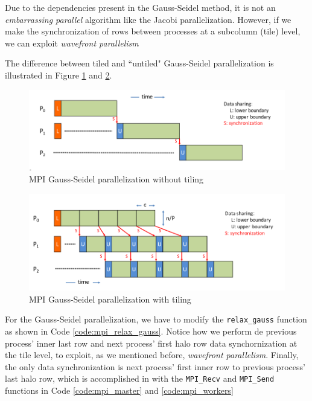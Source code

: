 \documentclass[titlepage]{article}
\newcommand{\incode}[1]{\lstinline[style=inlineC,language=C]{#1}}
\begin{document}
Due to the dependencies present in the Gauss-Seidel method, it is not an \textit{embarrassing parallel} algorithm like the Jacobi parallelization. However, if we make the synchronization of rows between processes at a subcolumn (tile) level, we can exploit \textit{wavefront parallelism}

The difference between tiled and ``untiled" Gauss-Seidel parallelization is illustrated in Figure \ref{fig:mpi_gauss} and \ref{fig:mpi_gauss_tiled}.

\begin{figure}[H]
\centering
\includegraphics[width=1\textwidth]{mpi_gauss_normal.png}
\caption{MPI Gauss-Seidel parallelization without tiling}
\label{fig:mpi_gauss}
\end{figure}

\begin{figure}[H]
\centering
\includegraphics[width=1\textwidth]{mpi_gauss_tiled.png}
\caption{MPI Gauss-Seidel parallelization with tiling}
\label{fig:mpi_gauss_tiled}
\end{figure}

For the Gauss-Seidel parallelization, we have to modify the \incode{relax_gauss} function as shown in Code \ref{code:mpi_relax_gauss}. Notice how we perform de previous process' inner last row and next process' first halo row data synchornization at the tile level, to exploit, as we mentioned before, \textit{wavefront parallelism}. Finally, the only data synchronization is next process' first inner row to previous process' last halo row, which is accomplished in with the \incode{MPI_Recv} and \incode{MPI_Send} functions in Code \ref{code:mpi_master} and \ref{code:mpi_workers}
\end{document}
